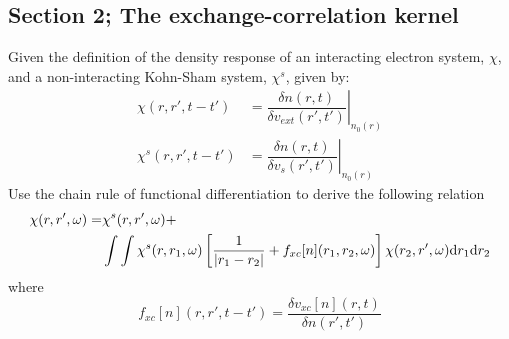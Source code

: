 \subsection{Section 2; The exchange-correlation kernel}
\begin{exercise}
Given the definition of the density response of an  interacting electron system, $\chi$, and a non-interacting Kohn-Sham system, $\chi^{s}$, given by:
\begin{align}
    \chi(r,r',t-t') &= \left.\dfrac{\delta n(r,t)}{\delta v_{ext}(r',t')}\right|_{n_0(r)} \label{eq:310}\\
    \chi^{s}(r,r',t-t') &= \left.\dfrac{\delta n(r,t)}{\delta v_{s}(r',t')}\right|_{n_0(r)}
    \label{eq:311}
\end{align}
Use the chain rule of functional differentiation to derive the following relation
\begin{equation}
\begin{split}
    \chi(r,r',\omega) =& \chi^{s}(r,r',\omega)+ \\&\int\int \chi^{s}(r,r_1,\omega)\left[ \dfrac{1}{\abs{r_1-r_2}} + f_{xc}[n](r_1,r_2,\omega)\right]\chi(r_2,r',\omega)\mathrm{d}r_1\mathrm{d}r_2
\end{split}
\end{equation}
where 
\begin{equation}
    f_{xc}[n](r,r',t-t') = \dfrac{\delta v_{xc}[n](r,t)}{\delta n(r',t')}\label{eq:313}
\end{equation}
\end{exercise}

